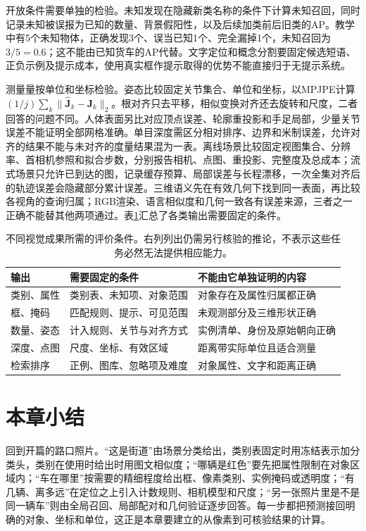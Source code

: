 开放条件需要单独的检验。未知发现在隐藏新类名称的条件下计算未知召回，同时记录未知被误报为已知的数量、背景假阳性，以及后续加类前后旧类的AP。教学中有5个未知物体，正确发现3个、误当已知1个、完全漏掉1个，未知召回为$3/5=0.6$；这不能由已知货车的AP代替。文字定位和概念分割要固定候选短语、正负示例及提示成本，使用真实框作提示取得的优势不能直接归于无提示系统。

测量量按单位和坐标检验。姿态比较固定关节集合、单位和坐标，以MPJPE计算$(1/j)\sum_k\lVert\hat{\bm J}_k-\bm J_k\rVert_2$。根对齐只去平移，相似变换对齐还去旋转和尺度，二者回答的问题不同。人体表面另比对应顶点误差、轮廓重投影和手足局部，少量关节误差不能证明全部网格准确。单目深度需区分相对排序、边界和米制误差，允许对齐的结果不能与未对齐的度量结果混为一表。离线场景比较固定视图集合、分辨率、首相机参照和拟合步数，分别报告相机、点图、重投影、完整度及总成本；流式场景只允许已到达的图，记录缓存预算、局部误差与长程漂移，一次全集对齐后的轨迹误差会隐藏部分累计误差。三维语义先在有效几何下找到同一表面，再比较各视角的查询归属；RGB渲染、语言相似度和几何一致各有误差来源，三者之一正确不能替其他两项通过。表\ref{tab:vision-recognition-protocols}汇总了各类输出需要固定的条件。

\begin{table}[htbp]
 \centering
 \small
 \begin{tabularx}{\linewidth}{@{}lXX@{}}
 \toprule
 输出 & 需要固定的条件 & 不能由它单独证明的内容\\
 \midrule
 类别、属性 & 类别表、未知项、对象范围 & 对象存在及属性归属都正确\\
 框、掩码 & 匹配规则、提示、可见范围 & 未观测部分及三维形状正确\\
 数量、姿态 & 计入规则、关节与对齐方式 & 实例清单、身份及原始朝向正确\\
 深度、点图 & 尺度、坐标、有效区域 & 距离带实际单位且适合测量\\
 检索排序 & 正例、图库、忽略项及难度 & 对象属性、文字和距离正确\\
 \bottomrule
 \end{tabularx}
 \caption{不同视觉成果所需的评价条件。右列列出仍需另行核验的推论，不表示这些任务必然无法提供相应能力。}
 \label{tab:vision-recognition-protocols}
\end{table}

\section{本章小结}
\label{sec:vision-recognition-summary}

回到开篇的路口照片。“这是街道”由场景分类给出，类别表固定时用冻结表示加分类头，类别在使用时给出时用图文相似度；“哪辆是红色”要先把属性限制在对象区域内；“车在哪里”按需要的精细程度给出框、像素类别、实例掩码或透明度；“有几辆、离多远”在定位之上引入计数规则、相机模型和尺度；“另一张照片里是不是同一辆车”则由全局召回、局部配对和几何验证逐步回答。每一步都把预测接回明确的对象、坐标和单位，这正是本章要建立的从像素到可核验结果的计算。

